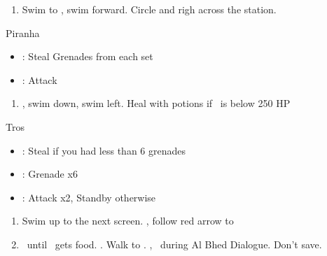 \begin{enumerate}[resume]
  \item Swim to \save, swim forward. Circle and righ across the station.
\end{enumerate}
\begin{battle}{Piranha}
  \begin{itemize}
    \item \rikku: Steal Grenades from each set
    \item \tidus: Attack
  \end{itemize}
\end{battle}
\begin{enumerate}[resume]
  \item \cs, swim down, swim left. Heal with potions if \rikku\ is  below 250 HP
\end{enumerate}
\begin{battle}[2200]{Tros}
  \begin{itemize}
    \item \rikku: Steal if you had less than 6 grenades
    \item \rikku: Grenade x6
    \item \tidus: Attack x2, Standby otherwise
  \end{itemize}
\end{battle}
\begin{enumerate}[resume]
  \item Swim up to the next screen. \cs, follow red arrow to \cs[0:50]
  \item \sd\ until \tidus \ gets food. \cs[3:00]. Walk to \rikku. \cs[2:30], \sd\ during Al Bhed Dialogue. Don't save.
\end{enumerate}